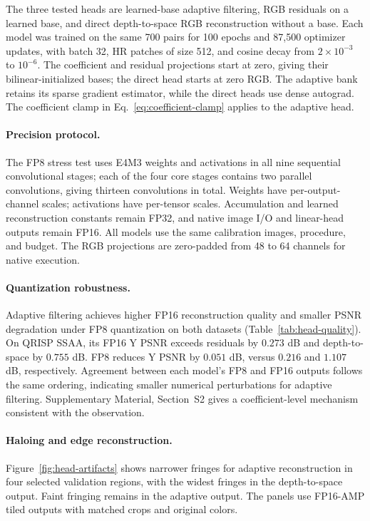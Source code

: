 \documentclass[10pt,twocolumn,letterpaper]{article}
\begin{document}
The three tested heads are learned-base adaptive filtering, RGB residuals on a learned base, and direct depth-to-space RGB reconstruction without a base.
Each model was trained on the same 700 pairs for 100 epochs and 87,500 optimizer updates, with batch 32, HR patches of size 512, and cosine decay from $2\times10^{-3}$ to $10^{-6}$.
The coefficient and residual projections start at zero, giving their bilinear-initialized bases; the direct head starts at zero RGB.
The adaptive bank retains its sparse gradient estimator, while the direct heads use dense autograd.
The coefficient clamp in Eq.~\eqref{eq:coefficient-clamp} applies to the adaptive head.

\paragraph{Precision protocol.}
The FP8 stress test uses E4M3 weights and activations in all nine sequential convolutional stages; each of the four core stages contains two parallel convolutions, giving thirteen convolutions in total.
Weights have per-output-channel scales; activations have per-tensor scales.
Accumulation and learned reconstruction constants remain FP32, and native image I/O and linear-head outputs remain FP16.
All models use the same calibration images, procedure, and budget.
The RGB projections are zero-padded from 48 to 64 channels for native execution.



\paragraph{Quantization robustness.}
Adaptive filtering achieves higher FP16 reconstruction quality and smaller PSNR degradation under FP8 quantization on both datasets (Table~\ref{tab:head-quality}).
On QRISP SSAA, its FP16 Y PSNR exceeds residuals by $0.273$ dB and depth-to-space by $0.755$ dB.
FP8 reduces Y PSNR by $0.051$ dB, versus $0.216$ and $1.107$ dB, respectively.
Agreement between each model's FP8 and FP16 outputs follows the same ordering, indicating smaller numerical perturbations for adaptive filtering.
Supplementary Material, Section~S2 gives a coefficient-level mechanism consistent with the observation.

\paragraph{Haloing and edge reconstruction.}
\label{sec:head-artifacts}
Figure~\ref{fig:head-artifacts} shows narrower fringes for adaptive reconstruction in four selected validation regions, with the widest fringes in the depth-to-space output.
Faint fringing remains in the adaptive output.
The panels use FP16-AMP tiled outputs with matched crops and original colors.
\end{document}
